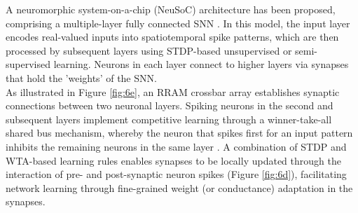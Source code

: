 
\noindent A neuromorphic system-on-a-chip (NeuSoC) architecture has been proposed, comprising a multiple-layer fully connected SNN \cite{kheradpisheh2018stdp}. In this model, the input layer encodes real-valued inputs into spatiotemporal spike patterns, which are then processed by subsequent layers using STDP-based unsupervised or semi-supervised learning. Neurons in each layer connect to higher layers via synapses that hold the 'weights' of the SNN.\\



\noindent As illustrated in Figure \ref{fig:6e}, an RRAM crossbar array establishes synaptic connections between two neuronal layers. Spiking neurons in the second and subsequent layers implement competitive learning through a winner-take-all shared bus mechanism, whereby the neuron that spikes first for an input pattern inhibits the remaining neurons in the same layer \cite{markram2012spike}. A combination of STDP and WTA-based learning rules enables synapses to be locally updated through the interaction of pre- and post-synaptic neuron spikes (Figure \ref{fig:6d}), facilitating network learning through fine-grained weight (or conductance) adaptation in the synapses.\\


